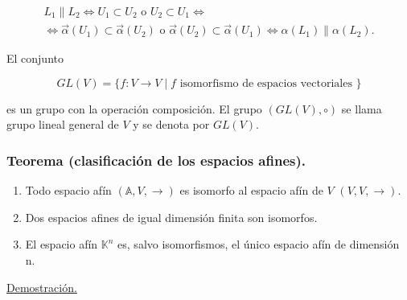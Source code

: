 \documentclass[12pt, a4paper, ones, notitlepage, openany,titlepage]{article}
\begin{document}
\begin{enumerate}
\begin{enumerate}
		\begin{gather*}
			L_{1} \| L_{2} \Longleftrightarrow U_{1} \subset U_{2} \text { o } U_{2} \subset U_{1} \Longleftrightarrow \\
			\Longleftrightarrow \vec{\alpha}\left(U_{1}\right) \subset \vec{\alpha}\left(U_{2}\right) \text { o } \vec{\alpha}\left(U_{2}\right) \subset \vec{\alpha}\left(U_{1}\right) \Longleftrightarrow \alpha\left(L_{1}\right) \| \alpha\left(L_{2}\right) .
		\end{gather*}
		
		El conjunto
		
		$$
		G L(V)=\{f: V \rightarrow V \mid f \text { isomorfismo de espacios vectoriales }\}
		$$
		
		es un grupo con la operación composición. El grupo $(G L(V), \circ)$ se llama grupo lineal general de $V$ y se denota por $G L(V)$.
		
	\end{enumerate}
\end{enumerate}

\subsubsection{Teorema (clasificación de los espacios afines).}
\begin{enumerate}
	
	\item Todo espacio afín $(\mathbb{A}, V, \rightarrow)$ es isomorfo al espacio afín de $V$ $(V,V,\rightarrow)$.
	
	\item Dos espacios afines de igual dimensión finita son isomorfos.
	
	\item El espacio afín $\mathbb{K}^{n}$ es, salvo isomorfismos, el único espacio afín de dimensión n.
	
\end{enumerate}

\underline{Demostración.}
\end{document}
